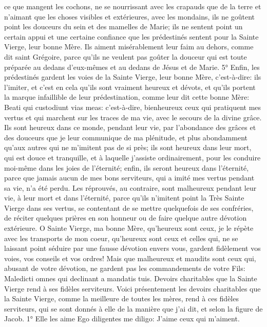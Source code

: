 ce que mangent les cochons, ne se nourrissant avec les crapauds que de la terre et n'aimant que les choses
visibles et extérieures, avec les mondains, ils ne goûtent point les douceurs du sein et des mamelles de Marie; ils
ne sentent point un certain appui et une certaine confiance que les prédestinés sentent pour la Sainte Vierge, leur
bonne Mère. Ils aiment misérablement leur faim au dehors, comme dit saint Grégoire, parce qu'ils ne veulent pas
goûter la douceur qui est toute préparée au dedans d'eux-mêmes et au dedans de Jésus et de Marie.
 5° Enfin, les prédestinés gardent les voies de la Sainte Vierge, leur bonne Mère, c'est-à-dire: ils l'imiter, et
c'est en cela qu'ils sont vraiment heureux et dévots, et qu'ils portent la marque infaillible de leur prédestination,
comme leur dit cette bonne Mère: Beati qui custodiunt vias meas: c'est-à-dire, bienheureux ceux qui pratiquent
mes vertus et qui marchent sur les traces de ma vie, avec le secours de la divine grâce. Ils sont heureux dans ce
monde, pendant leur vie, par l'abondance des grâces et des douceurs que je leur communique de ma plénitude, et
plus abondamment qu'aux autres qui ne m'imitent pas de si près; ils sont heureux dans leur mort, qui est douce et
tranquille, et à laquelle j'assiste ordinairement, pour les conduire moi-même dans les joies de l'éternité; enfin, ils
seront heureux dans l'éternité, parce que jamais aucun de mes bons serviteurs, qui a imité mes vertus pendant sa
vie, n'a été perdu.
Les réprouvés, au contraire, sont malheureux pendant leur vie, à leur mort et dans l'éternité, parce qu'ils n'imitent
point la Très Sainte Vierge dans ses vertus, se contentant de se mettre quelquefois de ses confréries, de réciter
quelques prières en son honneur ou de faire quelque autre dévotion extérieure. O Sainte Vierge, ma bonne Mère,
qu'heureux sont ceux, je le répète avec les transports de mon coeur, qu'heureux sont ceux et celles qui, ne se
laissant point séduire par une fausse dévotion envers vous, gardent fidèlement vos voies, vos conseils et vos
ordres! Mais que malheureux et maudits sont ceux qui, abusant de votre dévotion, ne gardent pas les
commandements de votre Fils: Maledicti omnes qui declinant a mandatis tuis.
Devoirs charitables que la Sainte Vierge rend à ses fidèles serviteurs.
 Voici présentement les devoirs charitables que la Sainte Vierge, comme la meilleure de toutes les mères,
rend à ces fidèles serviteurs, qui se sont donnés à elle de la manière que j'ai dit, et selon la figure de Jacob.
1° Elle les aime
Ego diligentes me diligo: J'aime ceux qui m'aiment.

